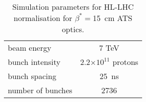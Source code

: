 \begin{table}[!hbt]
   \centering
   \caption{Simulation parameters for HL-LHC normalisation for $\beta^* =$15~cm ATS optics.}
   \begin{tabular}{l|c}
       \hline
       beam energy & 7 TeV \\
       bunch intensity & 2.2$\times 10^{11}$ protons\\
       bunch spacing & 25~ns \\
       number of bunches & 2736 \\
       \hline
   \end{tabular}
   \label{hlscenario}
\end{table}
